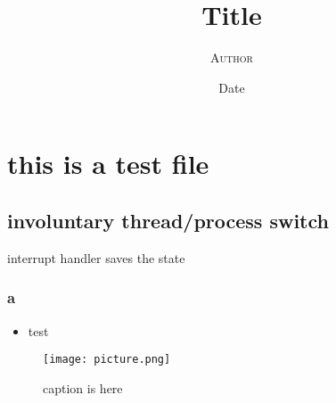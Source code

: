 \documentclass{article}
\begin{document}
\title{\textbf{Title}}
\author{\textsc{Author}}
\date{Date}
\maketitle

\section*{this is a test file}
\subsection*{involuntary thread/process switch}
interrupt handler saves the state

\subsubsection*{a}
\begin{displayquote}
\begin{itemize}
\item test
\end{itemize}
\end{displayquote}
\begin{figure}[H]
  \begin{center}
    \texttt{[image: picture.png]}
    \caption{caption is here}
    \label{label}
  \end{center}
\end{figure}
\end{document}
